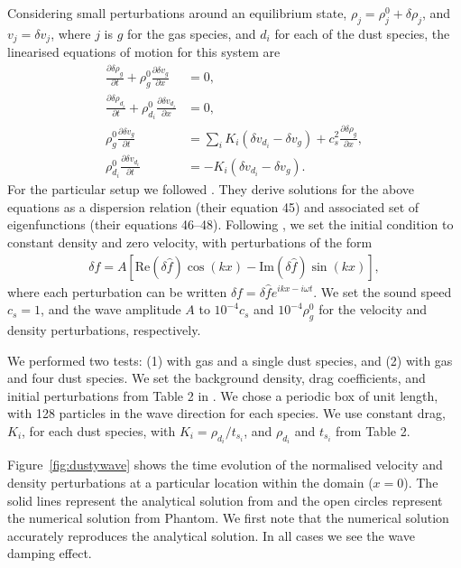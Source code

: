 \documentclass[fleqn,usenatbib]{mnras}
\begin{document}
Considering small perturbations around an equilibrium state, \(\rho_j = \rho_j^0
+ \delta \rho_j\), and \(v_j = \delta v_j\), where \(j\) is \(g\) for the gas
species, and \(d_i\) for each of the dust species, the linearised equations of
motion for this system are
%
\begin{align}
   \frac{\partial \delta \rho_g}{\partial t}
      + \rho_g^0 \frac{\partial \delta v_g}{\partial x} &= 0, \\
   \frac{\partial \delta \rho_{d_i}}{\partial t}
      + \rho_{d_i}^0 \frac{\partial \delta v_{d_i}}{\partial x} &= 0, \\
   \rho_g^0 \frac{\partial \delta v_g}{\partial t}
      &= \sum_i K_i \left(\delta v_{d_i} - \delta v_g \right)
         + c_s^2 \frac{\partial \delta \rho_g}{\partial x}, \\
   \rho_{d_i}^0 \frac{\partial \delta v_{d_i}}{\partial t}
      &= - K_i \left(\delta v_{d_i} - \delta v_{g}\right).
\end{align}
%
For the particular setup we followed \citet{Benitez-Llambay2019ApJS..241...25B}.
They derive solutions for the above equations as a dispersion relation (their
equation 45) and associated set of eigenfunctions (their equations 46--48).
Following \citet{Benitez-Llambay2019ApJS..241...25B}, we set the initial
condition to constant density and zero velocity, with perturbations of the form
%
\begin{align}
   \delta f = A \left[\mathrm{Re} \left(\delta \hat{f} \right) \cos(kx)
      - \mathrm{Im} \left(\delta \hat{f} \right) \sin(kx) \right],
\end{align}
%
where each perturbation can be written \(\delta f = \delta \hat{f} e^{ikx -
i\omega t}\). We set the sound speed \(c_s = 1\), and the wave amplitude \(A\)
to \(10^{-4} c_s\) and \(10^{-4} \rho_g^0\) for the velocity and density
perturbations, respectively.

We performed two tests: (1) with gas and a single dust species, and (2) with gas
and four dust species. We set the background density, drag coefficients, and
initial perturbations from Table 2 in
\citet{Benitez-Llambay2019ApJS..241...25B}. We chose a periodic box of unit
length, with 128 particles in the wave direction for each species. We use
constant drag, \(K_i\), for each dust species, with \(K_i = \rho_{d_i} /
t_{s_i}\), and \(\rho_{d_i}\) and \(t_{s_i}\) from Table 2.

Figure~\ref{fig:dustywave} shows the time evolution of the normalised velocity
and density perturbations at a particular location within the domain (\(x=0\)).
The solid lines represent the analytical solution from
\citet{Benitez-Llambay2019ApJS..241...25B} and the open circles represent the
numerical solution from Phantom. We first note that the numerical solution
accurately reproduces the analytical solution. In all cases we see the wave
damping effect.
\end{document}

